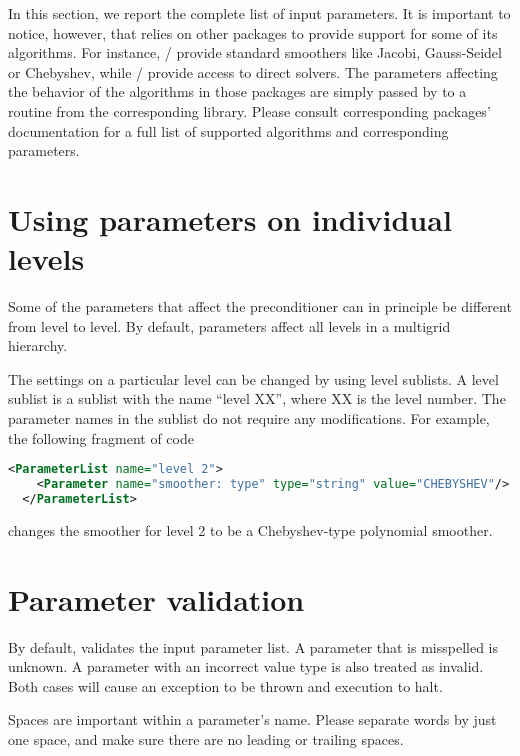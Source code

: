 \label{sec:muelu_options}

In this section, we report the complete list of \muelu{} input parameters.  It
is important to notice, however, that \muelu{} relies on other \trilinos{}
packages to provide support for some of its algorithms. For instance,
\ifpack{}/\ifpacktwo{} provide standard smoothers like Jacobi, Gauss-Seidel or
Chebyshev, while \amesos{}/\amesostwo{} provide access to direct solvers. The
parameters affecting the behavior of the algorithms in those packages are
simply passed by \muelu{} to a routine from the corresponding library. Please
consult corresponding packages' documentation for a full list of supported
algorithms and corresponding parameters.

\section{Using parameters on individual levels}
Some of the parameters that affect the preconditioner can in principle be
different from level to level. By default, parameters affect all levels in
a multigrid hierarchy.

The settings on a particular level can be changed by using level sublists.
A level sublist is a \parameterlist{} sublist with the name ``level XX'', where XX is the level number. The
parameter names in the sublist do not require any modifications. For example,
the following fragment of code
\begin{lstlisting}[language=XML]
  <ParameterList name="level 2">
    <Parameter name="smoother: type" type="string" value="CHEBYSHEV"/>
  </ParameterList>
\end{lstlisting}
changes the smoother for level 2 to be a Chebyshev-type polynomial smoother.

\section{Parameter validation}
By default, \muelu{} validates the input parameter list. A parameter that is
misspelled is unknown. A parameter with an incorrect value type is also treated as invalid.
Both cases will cause an exception to be
thrown and execution to halt.

\begin{mycomment}
Spaces are important within a parameter's name. Please separate words
by just one space, and make sure there are no leading or trailing spaces.
\end{mycomment}

